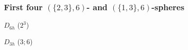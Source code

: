 \documentclass{beamer}
\begin{document}
\begin{frame}\frametitle{First four $(\{2,3\},6)$- and
$(\{1, 3\},6)$-spheres}
\vspace{-2.5mm}

\begin{center}
\begin{minipage}[b]{26mm}
\centering
{}\par
$D_{6h}$ ($2^3$)
\end{minipage}  
\begin{minipage}[b]{23mm}
\centering
{}\par
$D_{3h}$ ($3;6$)
\end{minipage}
\begin{minipage}[b]{24mm}
\centering
{}\par

\end{minipage}
\end{center}
\end{frame}
\end{document}
